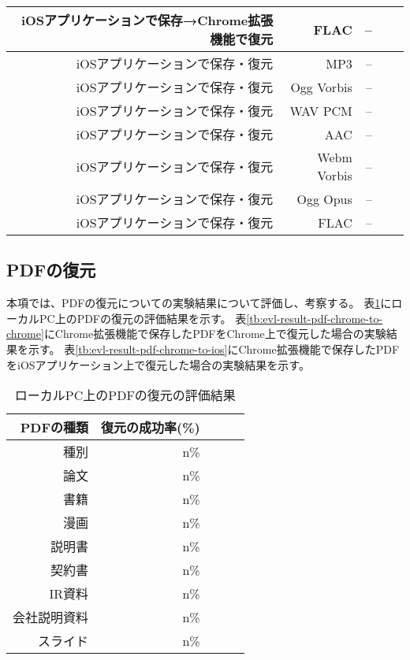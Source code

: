 \begin{table}[htbp]
\begin{center}
\begin{tabular}{rrrrr}
      iOSアプリケーションで保存→Chrome拡張機能で復元 & FLAC & --  \\ \hline
      iOSアプリケーションで保存・復元 & MP3 & --  \\ \hline
      iOSアプリケーションで保存・復元 & Ogg Vorbis & --  \\ \hline
      iOSアプリケーションで保存・復元 & WAV PCM & --  \\ \hline
      iOSアプリケーションで保存・復元 & AAC & --  \\ \hline
      iOSアプリケーションで保存・復元 & Webm Vorbis & --  \\ \hline
      iOSアプリケーションで保存・復元 & Ogg Opus & --  \\ \hline
      iOSアプリケーションで保存・復元 & FLAC & --  \\ \hline
    \end{tabular}
  \end{center}
\end{table}

\subsection{PDFの復元}
本項では、PDFの復元についての実験結果について評価し、考察する。
表\ref{tb:evl-result-pdf-chrome-to-chrome-local}にローカルPC上のPDFの復元の評価結果を示す。
表\ref{tb:evl-result-pdf-chrome-to-chrome}にChrome拡張機能で保存したPDFをChrome上で復元した場合の実験結果を示す。
表\ref{tb:evl-result-pdf-chrome-to-ios}にChrome拡張機能で保存したPDFをiOSアプリケーション上で復元した場合の実験結果を示す。


\begin{table}[htbp]
  \caption{ローカルPC上のPDFの復元の評価結果}
  \label{tb:evl-result-pdf-chrome-to-chrome-local}
  \begin{center}
    \begin{tabular}{rrrrr}
      \hline
      PDFの種類  & 復元の成功率(\%) \\ \hline \hline
        種別 & n\%  \\ \hline
        論文 & n\% \\ \hline
        書籍 & n\% \\ \hline
        漫画 & n\% \\ \hline
        説明書 & n\% \\ \hline
        契約書 & n\% \\ \hline
        IR資料 & n\% \\ \hline
        会社説明資料 & n\% \\ \hline
        スライド & n\% \\ \hline
    \end{tabular}
  \end{center}
\end{table}

